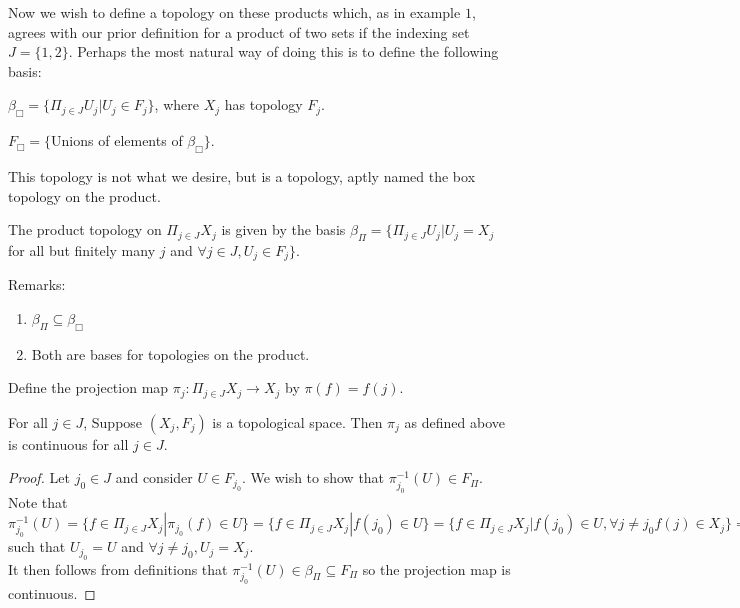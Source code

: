 Now we wish to define a topology on these products which, as in example $1$, agrees with our prior definition for a product of two sets if the indexing set $J = \{1,2\}$. Perhaps the most natural way of doing this is to define the following basis: 
\begin{center}
	$\beta_{\Box} = \{\Pi_{j \in J} U_j|U_j \in F_j\}$, where $X_j$ has topology $F_j$.
	
	$F_{\Box} = \{$Unions of elements of $\beta_{\Box}\}.$ 
\end{center}
This topology is not what we desire, but is a topology, aptly named the box topology on the product.
\begin{example}
	The product topology on $\Pi_{j \in J}X_j$ is given by the basis $\beta_{\Pi} = \{\Pi_{j \in J}U_j|U_j = X_j$ for all but finitely many $j$ and $\forall j \in J, U_j \in F_j \}$. 
\end{example}

Remarks: 
\begin{enumerate}
	\item $\beta_{\Pi} \subseteq \beta_{\Box}$ 
	\item Both are bases for topologies on the product. 
\end{enumerate}
\begin{definition}
	Define the projection map $\pi_j : \Pi_{j \in J}X_j \rightarrow X_j$ by $\pi(f) = f(j)$. 
\end{definition}
\begin{lemma}
	For all $j \in J$, Suppose $(X_j, F_j)$ is a topological space. Then $\pi_j$ as defined above is continuous for all $j \in J$. 
\end{lemma}
\begin{proof}
	Let $j_{0} \in J$ and consider $U \in F_{j_{0}}$. We wish to show that $\pi_{j_{0}}^{-1}(U) \in F_{\Pi}$. Note that $\pi_{j_{0}}^{-1}(U) = \{f \in \Pi_{j \in J}X_j | \pi_{j_{0}}(f) \in U\} = \{f \in \Pi_{j \in J}X_j | f(j_{0}) \in U\} = \{f \in \Pi_{j \in J}X_j | f(j_{0}) \in U, \forall j \neq j_{0} f(j) \in X_{j}\}= \Pi_{j \in J} U_j$ such that $U_{j_{0}} = U$ and $\forall j \neq j_{0}, U_j = X_j$.\\
	It then follows from definitions that $\pi_{j_{0}}^{-1}(U) \in \beta_{\Pi} \subseteq F_{\Pi}$ so the projection map is continuous. 
\end{proof}

